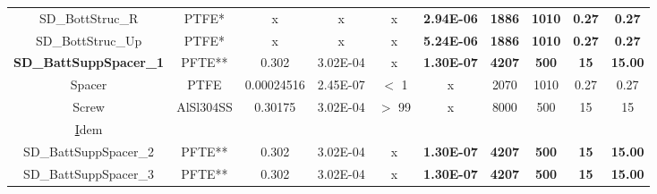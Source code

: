 \begin{table}[H]
{\begin{tabular}{@{}cccccccccc@{}}
  SD\_BottStruc\_R                       & PTFE*      & x                   & x                 & x                          & \textbf{2.94E-06}               & \textbf{1886}                     & \textbf{1010}                         & \textbf{0.27}                            & \textbf{0.27}                            \\
  SD\_BottStruc\_Up                      & PTFE*      & x                   & x                 & x                          & \textbf{5.24E-06}               & \textbf{1886}                     & \textbf{1010}                         & \textbf{0.27}                            & \textbf{0.27}                            \\ \midrule
  \textbf{SD\_BattSuppSpacer\_1}         & PFTE** & 0.302 & 3.02E-04 & x                & \textbf{1.30E-07}               & \textbf{4207}                     & \textbf{500}                          & \textbf{15}                               & \textbf{15.00}                            \\
  Spacer                                   & PTFE       & 0.00024516          & 2.45E-07          & $<$ 1                 & x                                &  2070                              & 1010                                  & 0.27                                    & 0.27                                      \\
  Screw                                  & AlSl304SS  & 0.30175             & 3.02E-04          & $>$ 99                  & x                                &   8000                        & 500                                 & 15                                       &   15                                        \\
  {\ul Idem}                              &            &                     &                   &                            &                                 &                                   &                                       &                                           &                                           \\
  SD\_BattSuppSpacer\_2                  & PFTE**          & 0.302 & 3.02E-04 & x                 & \textbf{1.30E-07}               & \textbf{4207}                     & \textbf{500}                          & \textbf{15}                               & \textbf{15.00}                            \\
  SD\_BattSuppSpacer\_3                  & PFTE**          & 0.302 & 3.02E-04 & x                 & \textbf{1.30E-07}               & \textbf{4207}                     & \textbf{500}                          & \textbf{15}                               & \textbf{15.00}                            \\

\end{tabular}}
\end{table}
